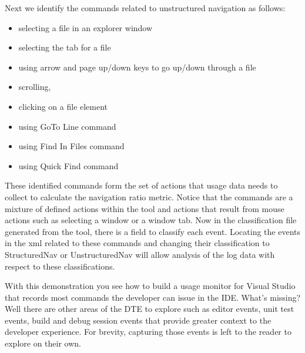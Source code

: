 Next we identify the commands related to unstructured navigation as follows:
\begin{itemize}
\item selecting a file in an explorer window
\item selecting the tab for a file
\item using arrow and page up/down keys to go up/down through a file
\item scrolling,
\item clicking on a file element
\item using GoTo Line command
\item using Find In Files command
\item using Quick Find command
\end{itemize}

These identified commands form the set of actions that usage data needs to collect to calculate the navigation ratio metric.  Notice that the commands are a mixture of defined actions within the tool and actions that result from mouse actions such as selecting a window or a window tab.  Now in the classification file generated from the tool, there is a field to classify each event.  Locating the events in the xml related to these commands and changing their classification to StructuredNav or UnstructuredNav will allow analysis of the log data with respect to these classifications.

With this demonstration you see how to build a usage monitor for Visual Studio that records most commands the developer can issue in the IDE.  What's missing?  Well there are other areas of the DTE to explore such as editor events, unit test events, build and debug session events that provide greater context to the developer experience.  For brevity, capturing those events is left to the reader to explore on their own.




